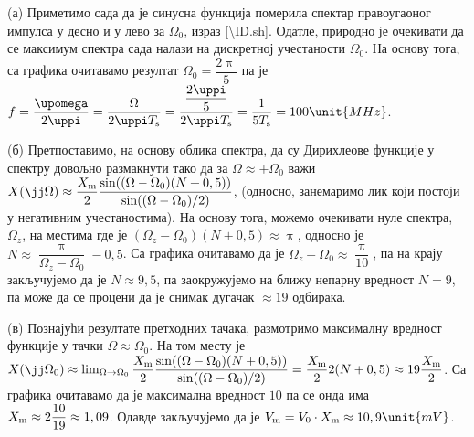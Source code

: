 (а) Приметимо сада да је синусна функција померила спектар правоугаоног импулса у десно и у лево за 
$\Omega_0$, израз \eqref{\ID.sh}. Одатле, природно је очекивати да се максимум спектра сада налази на дискретној учестаности 
$\Omega_0$. На основу тога, са графика очитавамо резултат $\Omega_0 = \dfrac{2\uppi}{5}$ па је 
$f = \dfrac{\upomega}{2\uppi} = \dfrac{\Omega}{2\uppi T_{\rm s}} = \dfrac{ \dfrac{2\uppi}{5} }{2 \uppi T_{\rm s}}
= \dfrac{1}{5 T_{\rm s}} = 100 \unit{MHz}$. 

(б) Претпоставимо, на основу облика спектра, да су Дирихлеове функције у спектру довољно размакнути тако да 
за  $\Omega \approx +\Omega_0$ важи $X(\jj\Omega) \approx \dfrac{X_{\rm m}}{2} \dfrac{\sin( (\Omega - \Omega_0)(N + 0,5) ) }{ \sin((\Omega - \Omega_0)/2) }$, 
(односно, занемаримо лик који постоји у негативним учестаностима). На основу тога, можемо очекивати нуле спектра, 
$\Omega_z$,  
на местима где је $(\Omega_z - \Omega_0)(N + 0,5) \approx \uppi$, односно је 
$ N \approx \dfrac{\uppi}{\Omega_z - \Omega_0} - 0,5$. Са графика очитавамо да је 
${\Omega_z - \Omega_0} \approx \dfrac{\uppi}{10}$, па на крају закључујемо да је $N \approx 9,5$, па заокружујемо на 
ближу непарну вредност $N = 9$, па може да се процени да је снимак дугачак $\approx 19$ одбирака. 

(в) Познајући резултате претходних тачака, размотримо максималну вредност функције у тачки $\Omega \approx \Omega_0$. 
На том месту је 
$X(\jj\Omega_0) \approx \lim_{\Omega \to \Omega_0} \dfrac{X_{\rm m}}{2} \dfrac{\sin( (\Omega - \Omega_0)(N + 0,5) ) }{ \sin((\Omega - \Omega_0)/2) }
= \dfrac{X_{\rm m}}{2} 2(N + 0,5) \approx 19 \dfrac{X_{\rm m}}{2}$. Са графика очитавамо да је максимална вредност $10$ па се онда има 
$X_{\rm m} \approx 2 \dfrac{10}{19} \approx 1,09$. Одавде закључујемо да је $V_{\rm m} = V_0 \cdot X_{\rm m} 
\approx 10,9\unit{mV}$. 
